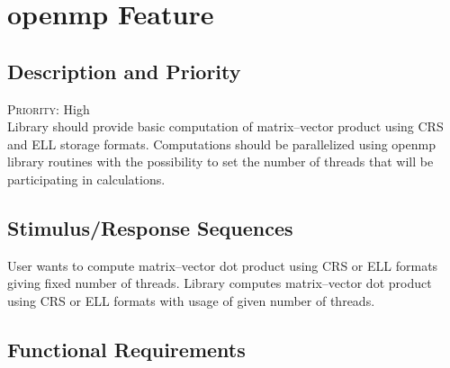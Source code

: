 \section{\gls{openmp} Feature} \label{s:system-features:openmp-feature}
	\begin{comment}
		$<$Don’t really say “System Feature 1.” State the feature name in just a few 
		words.$>$
	\end{comment}
	
\subsection*{Description and Priority}
	\begin{comment}
		$<$Provide a short description of the feature and indicate whether it is of 
		High, Medium, or Low priority. You could also include specific priority 
		component ratings, such as benefit, penalty, cost, and risk (each rated on a 
		relative scale from a low of 1 to a high of 9).$>$
	\end{comment}
	\textsc{Priority:} High \\
	Library should provide basic computation of matrix--vector product using \glsdesc{CRS} and \glsdesc{ELL} storage formats. Computations should be parallelized using \gls {openmp} library routines with the possibility to set the number of threads that will be participating in calculations.
\subsection*{Stimulus/Response Sequences}
	\begin{comment}
		$<$List the sequences of user actions and system responses that stimulate the 
		behavior defined for this feature. These will correspond to the dialog elements 
		associated with use cases.$>$
	\end{comment}
	
	\stimresp
	{User wants to compute matrix--vector dot product using \gls{CRS} or \gls{ELL} formats giving fixed number of threads.}
	{Library computes matrix--vector dot product using \gls{CRS} or \gls{ELL} formats with usage of given number of threads.}
\subsection*{Functional Requirements}
	\begin{comment}
		$<$Itemize the detailed functional requirements associated with this feature.  
		These are the software capabilities that must be present in order for the user 
		to carry out the services provided by the feature, or to execute the use case.  
		Include how the product should respond to anticipated error conditions or 
		invalid inputs. Requirements should be concise, complete, unambiguous, 
		verifiable, and necessary. Use “TBD” as a placeholder to indicate when necessary 
		information is not yet available.$>$
		
		$<$Each requirement should be uniquely identified with a sequence number or a 
		meaningful tag of some kind.$>$
		
		REQ-1:	REQ-2:
	\end{comment}
	
